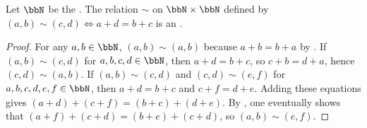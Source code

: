 \begin{proposition} \label{proposition:integer_equivalence_relation}
Let $\bbN$ be the . The relation $\sim$ on $\bbN \times \bbN$ defined by $(a, b) \sim (c, d) \iff a + d = b + c$ is an .
\end{proposition}

\begin{proof}
For any $a,b \in \bbN$, $(a, b) \sim (a, b)$ because $a + b = b + a$ by . If $(a, b) \sim (c, d)$ for $a,b,c,d \in \bbN$, then $a + d = b + c$, so $c + b = d + a$, hence $(c, d) \sim (a, b)$. If $(a, b) \sim (c, d)$ and $(c, d) \sim (e, f)$ for $a,b,c,d,e,f \in \bbN$, then $a + d = b + c$ and $c + f = d + e$. Adding these equations gives $(a + d) + (c + f) = (b + c) + (d + e)$. By , one eventually shows that $(a+f)+(c+d) = (b+e)+(c+d)$, so $(a, b) \sim (e, f)$.
\end{proof}
